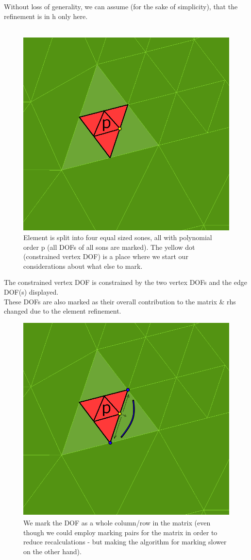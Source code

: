 \documentclass{beamer}
\begin{document}
\begin{frame}
Without loss of generality, we can assume (for the sake of simplicity), that the refinement is in h only here.\ \\\ \\

\begin{center}
	\begin{figure}[h!]
			\centering
			\includegraphics[width=.4\textwidth]{recalculation-2.png}
			\caption{Element is split into four equal sized sones, all with polynomial order p (all DOFs of all sons are marked). The yellow dot (constrained vertex DOF) is a place where we start our considerations about what else to mark.}
	\end{figure}
\end{center}
\end{frame}

\begin{frame}
The constrained vertex DOF is constrained by the two vertex DOFs and the edge DOF(s) displayed.\ \\
These DOFs are also marked as their overall contribution to the matrix \& rhs changed due to the element refinement.

\begin{center}
	\begin{figure}[h!]
			\centering
			\includegraphics[width=.4\textwidth]{recalculation-3.png}
			\caption{We mark the DOF as a whole column/row in the matrix (even though we could employ marking pairs for the matrix in order to reduce recalculations - but making the algorithm for marking slower on the other hand).}
	\end{figure}
\end{center}
\end{frame}
\end{document}
